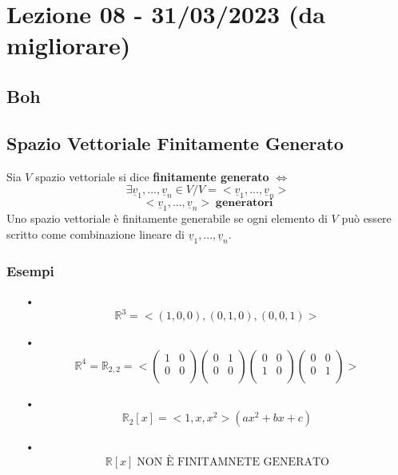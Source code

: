 \section{Lezione 08 - 31/03/2023 (da migliorare)}

\subsection{Boh}
\blindtext

\subsection{Spazio Vettoriale Finitamente Generato}
Sia $V$ spazio vettoriale si dice \textbf{finitamente generato} $ \Leftrightarrow $
$$ \exists \underline{v}_1,...,\underline{v}_n \in V / V = <\underline{v}_1,...,\underline{v}_n> $$
$$ <\underline{v}_1,...,\underline{v}_n> \; \textbf{generatori} $$
Uno spazio vettoriale è finitamente generabile se ogni
elemento di $V$ può essere scritto come combinazione lineare di $\underline{v}_1,...,\underline{v}_n$.\\

\subsubsection{Esempi}
\begin{itemize}
\item[•] $$ \mathbb{R}^3 = < (1,0,0),(0,1,0),(0,0,1) > $$
\item[•] $$ \mathbb{R}^4 = \mathbb{R}_{2,2} = < \begin{pmatrix}
1 & 0 \\
0 & 0 \\
\end{pmatrix}
\begin{pmatrix}
0 & 1 \\
0 & 0 \\
\end{pmatrix}
\begin{pmatrix}
0 & 0 \\
1 & 0 \\
\end{pmatrix}
\begin{pmatrix}
0 & 0 \\
0 & 1 \\
\end{pmatrix} >  $$
\item[•] $$ \mathbb{R}_2[x] = <1,x,x^2> (ax^2+bx+c)$$
\item[•] $$ \mathbb{R}[x] \; \text{NON È FINITAMNETE GENERATO}$$

\end{itemize}

